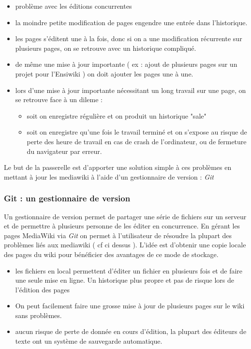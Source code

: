 \documentclass[11pt]{article}
\begin{document}
\begin{itemize}
\item problème avec les éditions concurrentes
\item la moindre petite modification de pages engendre une entrée dans l'historique.
\item les pages s'éditent une à la fois, donc si on a une modification récurrente sur plusieurs pages, on se retrouve avec un historique compliqué.
\item de même une mise à jour importante ( ex : ajout de plusieurs pages sur un projet pour l'Ensiwiki ) on doit ajouter les pages une à une.
\item lors d'une mise à jour importante nécessitant un long travail sur une page, on se retrouve face à un dileme :
\begin{itemize}
\item soit on enregistre régulière et on produit un historique "sale"
\item soit on enregistre qu'une fois le travail terminé et on s'expose au risque de perte des heure de travail en cas de crash de l'ordinateur, ou de fermeture du navigateur par erreur.
\end{itemize}
\end{itemize}

Le but de la passerelle est d'apporter une solution simple à ces problèmes en mettant à jour les mediawiki à l'aide d'un gestionnaire de version : \textit{Git}

\subsubsection{Git : un gestionnaire de version}

Un gestionnaire de version permet de partager une série de fichiers sur un serveur et de permettre à plusieurs personne de les éditer en concurrence.  En gérant les pages MediaWiki via \textit{Git} on permet à l'utilisateur de résoudre la plupart des problèmes liés aux mediawiki ( cf ci dessus ). L'idée est d'obtenir une copie locale des pages du wiki pour bénéficier des avantages de ce mode de stockage.

\begin{itemize}
\item les fichiers en local permettent d'éditer un fichier en plusieurs fois et de faire une seule mise en ligne. Un historique plus propre et pas de risque lors de l'édition des pages
\item On peut facilement faire une grosse mise à jour de plusieurs pages sur le wiki sans problèmes. 
\item aucun risque de perte de donnée en cours d'édition, la plupart des éditeurs de texte ont un système de sauvegarde automatique.
\end{itemize}
\end{document}
